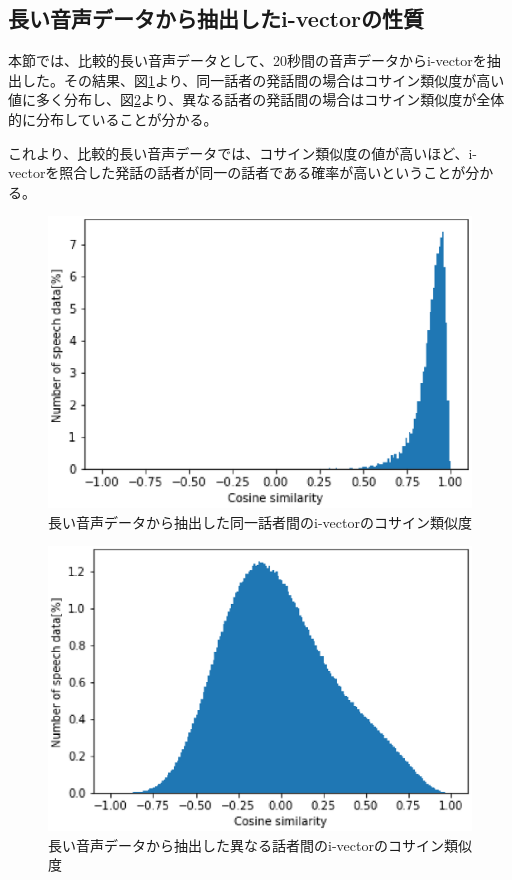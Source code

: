 \subsection{長い音声データから抽出したi-vectorの性質}
本節では、比較的長い音声データとして、20秒間の音声データからi-vectorを抽出した。その結果、図\ref{fig:iv_same_long}より、同一話者の発話間の場合はコサイン類似度が高い値に多く分布し、図\ref{fig:iv_other_long}より、異なる話者の発話間の場合はコサイン類似度が全体的に分布していることが分かる。\par
これより、比較的長い音声データでは、コサイン類似度の値が高いほど、i-vectorを照合した発話の話者が同一の話者である確率が高いということが分かる。

\begin{figure}[H]
  \begin{center}
    \includegraphics{../../image/same_sp_long.eps}
  \end{center}
  \caption{長い音声データから抽出した同一話者間のi-vectorのコサイン類似度 \label{fig:iv_same_long}}
\end{figure}

\begin{figure}[H]
  \begin{center}
    \includegraphics{../../image/other_sp_long.eps}
  \end{center}
  \caption{長い音声データから抽出した異なる話者間のi-vectorのコサイン類似度 \label{fig:iv_other_long}}
\end{figure}

